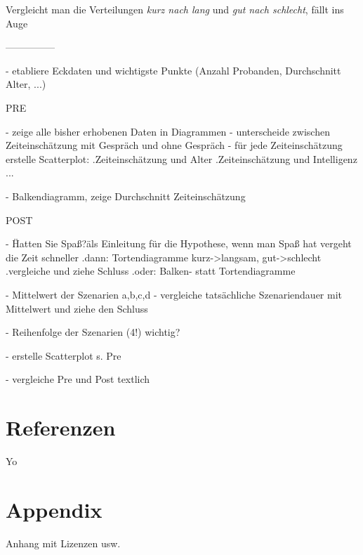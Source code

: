 \documentclass{Paper}
\begin{document}
	Vergleicht man die Verteilungen \textit{kurz nach lang} und \textit{gut nach schlecht}, fällt ins Auge	

	---------------


	- etabliere Eckdaten und wichtigste Punkte (Anzahl Probanden, Durchschnitt Alter, ...)

	PRE

	- zeige alle bisher erhobenen Daten in Diagrammen
		- unterscheide zwischen Zeiteinschätzung mit Gespräch und ohne Gespräch
		- für jede Zeiteinschätzung erstelle Scatterplot:
			.Zeiteinschätzung und Alter
			.Zeiteinschätzung und Intelligenz 
			...

		- Balkendiagramm, zeige Durchschnitt Zeiteinschätzung

	POST 

	- \"Hatten Sie Spaß?\" als Einleitung für die Hypothese, wenn man Spaß hat vergeht die Zeit schneller
		.dann: Tortendiagramme kurz->langsam, gut->schlecht
		.vergleiche und ziehe Schluss
		.oder: Balken- statt Tortendiagramme

	- Mittelwert der Szenarien a,b,c,d
	- vergleiche tatsächliche Szenariendauer mit Mittelwert und ziehe den Schluss

	- Reihenfolge der Szenarien (4!) wichtig? 

	- erstelle Scatterplot s. Pre


	- vergleiche Pre und Post textlich


\section{Referenzen}
		Yo
	
\section{Appendix} %
		Anhang mit Lizenzen usw.
	
\vfill %

\printbibliography
\end{document}

